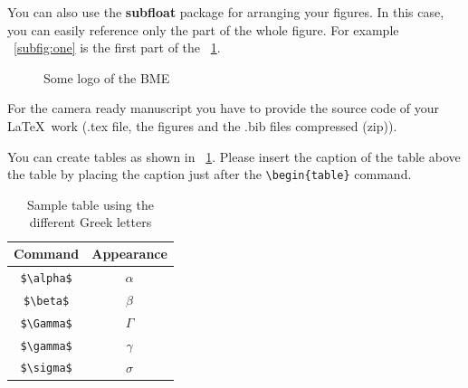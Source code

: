 \documentclass[twoside,b5paper,10pt]{article}
\begin{document}
You can also use the \textbf{subfloat} package for arranging your figures. In this case, you can easily reference only the part of the whole figure. For example \figurename~\ref{subfig:one} is the first part of the \figurename~\ref{fig:bme}.

 \begin{figure}[h]
        \centering
        \hspace{0.02\linewidth}
        \caption{Some logo of the BME}
        \label{fig:bme} %
\end{figure}




For the camera ready manuscript you have to
provide the source code of your \LaTeX \ work (.tex file, the
figures and the .bib files compressed (zip)).

You can create tables as shown in \tablename~\ref{tab:first}. Please
insert the caption of the table above the table by placing the
caption just after the \verb|\begin{table}| command.

\begin{table}[htb]
\caption{Sample table using the different Greek letters}
\begin{center}
\begin{tabular}{|c|c|}
\hline
\textbf{Command} & \textbf{Appearance} \\
\hline
\verb|$\alpha$| & $\alpha$ \\
\hline
\verb|$\beta$| & $\beta$ \\
\hline
\verb|$\Gamma$| & $\Gamma$ \\
\hline
\verb|$\gamma$| & $\gamma$ \\
\hline
\verb|$\sigma$| & $\sigma$ \\
\hline
\end{tabular}
\end{center}
\label{tab:first}
\end{table}
\end{document}
